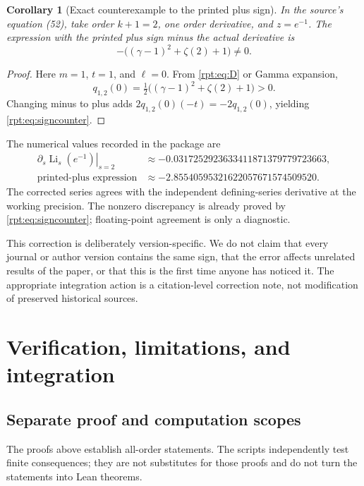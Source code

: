 \documentclass[11pt,a4paper]{article}
\numberwithin{equation}{section}
\newtheorem{corollary}[theorem]{Corollary}
\theoremstyle{definition}\newtheorem{definition}[theorem]{Definition}
\theoremstyle{remark}\newtheorem{remark}[theorem]{Remark}
\newcommand{\Li}{\operatorname{Li}}
\begin{document}
\begin{corollary}[Exact counterexample to the printed plus sign]
\label{rpt:cor:sign}
In the source's equation (52), take order $k+1=2$, one order derivative, and $z=e^{-1}$. The expression with the printed plus sign minus the actual derivative is
\begin{equation}
-\bigl((\gamma-1)^2+\zeta(2)+1\bigr)\ne0.
\label{rpt:eq:signcounter}
\end{equation}
\end{corollary}
\begin{proof}
Here $m=1$, $t=1$, and $\ell=0$. From \eqref{rpt:eq:D} or Gamma expansion,
\[
q_{1,2}(0)=\tfrac12\bigl((\gamma-1)^2+\zeta(2)+1\bigr)>0.
\]
Changing minus to plus adds $2q_{1,2}(0)(-t)=-2q_{1,2}(0)$, yielding \eqref{rpt:eq:signcounter}.
\end{proof}

The numerical values recorded in the package are
\begin{align*}
\left.\partial_s\Li_s(e^{-1})\right|_{s=2}
&\approx-0.0317252923633411871379779723663,\\
\text{printed-plus expression}
&\approx-2.85540595321622057671574509520.
\end{align*}
The corrected series agrees with the independent defining-series derivative at the working precision. The nonzero discrepancy is already proved by \eqref{rpt:eq:signcounter}; floating-point agreement is only a diagnostic.

This correction is deliberately version-specific. We do not claim that every journal or author version contains the same sign, that the error affects unrelated results of the paper, or that this is the first time anyone has noticed it. The appropriate integration action is a citation-level correction note, not modification of preserved historical sources.

\section{Verification, limitations, and integration}
\label{rpt:sec:verification}

\subsection{Separate proof and computation scopes}

The proofs above establish all-order statements. The scripts independently test finite consequences; they are not substitutes for those proofs and do not turn the statements into Lean theorems.
\end{document}
